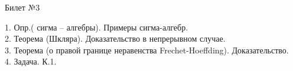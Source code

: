 \documentclass[preview]{standalone}
\begin{document}
 
\begin{center} {\Large Билет №3} \end{center} 

1.   Опр.( сигма – алгебры). Примеры сигма-алгебр.\\

2.  Теорема (Шкляра). Доказательство в непрерывном случае.\\

3.  Теорема (о правой границе неравенства Frechet-Hoeffding).  Доказательство.\\

4. Задача. К.1.\\
\end{document}
